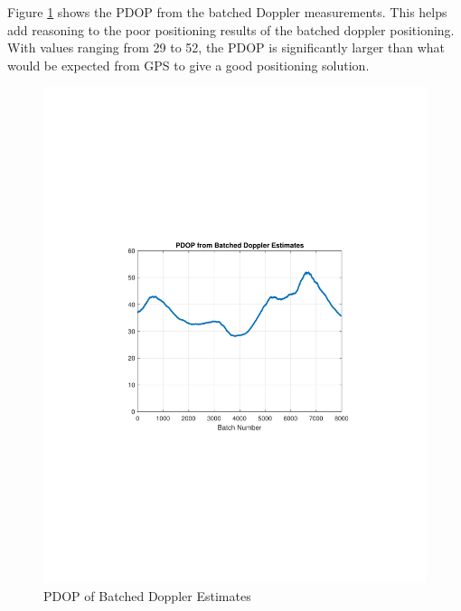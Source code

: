 \documentclass[12pt]{report}
\begin{document}
Figure \ref{fig:PDOPBatchDoppler} shows the PDOP from the batched Doppler measurements. This helps add reasoning to the poor positioning results of the batched doppler positioning. With values ranging from 29 to 52, the PDOP is significantly larger than what would be expected from GPS to give a good positioning solution. 

\begin{figure}[h!]
    \centering
    \includegraphics[trim=1.2in 3.3in 1.75in 3.3in,clip,width=5in]{Irid_Clean_15min_doppler_PDOP.pdf}
    \caption{PDOP of Batched Doppler Estimates}
    \label{fig:PDOPBatchDoppler}
\end{figure}
\end{document}
